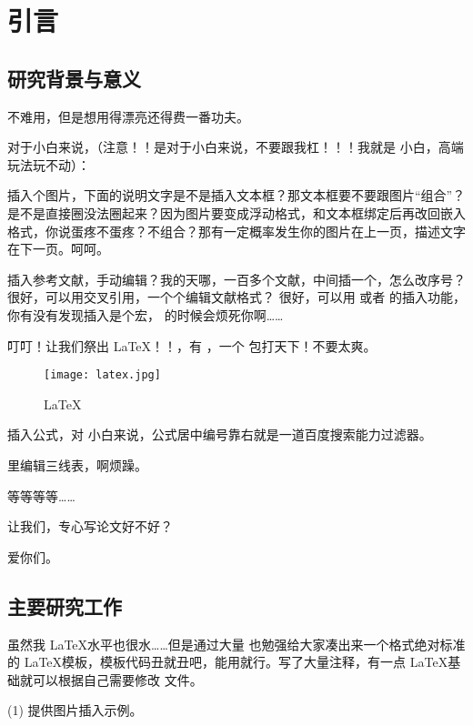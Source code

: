 \section{引言}
\subsection{研究背景与意义}

 不难用，但是想用得漂亮还得费一番功夫。

对于小白来说，（注意！！是对于小白来说，不要跟我杠！！！我就是  小白，高端玩法玩不动）：

插入个图片，下面的说明文字是不是插入文本框？那文本框要不要跟图片“组合”？是不是直接圈没法圈起来？因为图片要变成浮动格式，和文本框绑定后再改回嵌入格式，你说蛋疼不蛋疼？不组合？那有一定概率发生你的图片在上一页，描述文字在下一页。呵呵。

插入参考文献，手动编辑？我的天哪，一百多个文献，中间插一个，怎么改序号？
很好，可以用交叉引用，一个个编辑文献格式？
很好，可以用  或者  的插入功能，你有没有发现插入是个宏， 的时候会烦死你啊……

叮叮！让我们祭出 \LaTeX！！\cite{2013浅谈使用}，有 ，一个  包打天下！不要太爽。


\begin{figure}[hbt]
    \centering
    \texttt{[image: latex.jpg]}
    \caption{LaTeX}
    \label{F.latex}
\end{figure}

插入公式，对  小白来说，公式居中编号靠右就是一道百度搜索能力过滤器。

 里编辑三线表，啊烦躁。

等等等等……

让我们，专心写论文好不好？

爱你们。


\subsection{主要研究工作}
虽然我 \LaTeX 水平也很水……但是通过大量  也勉强给大家凑出来一个格式绝对标准的 \LaTeX 模板，模板代码丑就丑吧，能用就行。写了大量注释，有一点 \LaTeX 基础就可以根据自己需要修改  文件。

(1) 提供图片插入示例。

